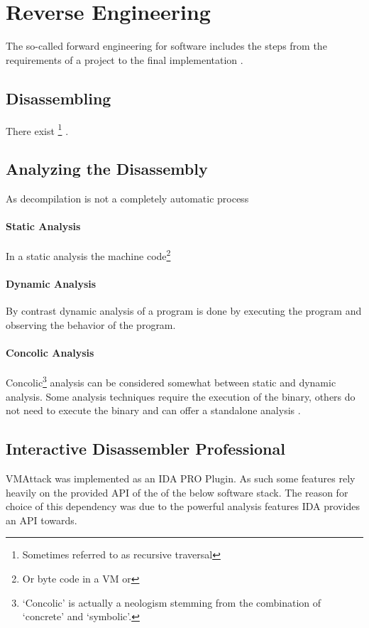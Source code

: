 \documentclass[10pt,twoside,a4paper,bibliography=totoc]{scrbook}
\begin{document}
\section{Reverse Engineering}
\label{sec2:re}
The so-called forward engineering for software includes the steps from the requirements of a project to the final implementation \cite{reeng}. 

\subsection{Disassembling}
\label{sec2:disassm}
There exist \footnote{Sometimes referred to as recursive traversal} \cite{idabook}.

\subsection{Analyzing the Disassembly}
\label{sec2:analysis}

As decompilation is not a completely automatic process

\paragraph*{Static Analysis}
In a static analysis the machine code\footnote{Or byte code in a VM or }

\paragraph*{Dynamic Analysis}
By contrast dynamic analysis of a program is done by executing the program and observing the behavior of the program.


\paragraph*{Concolic Analysis}
Concolic\footnote{`Concolic' is actually a neologism stemming from the combination of `concrete' and `symbolic'. } analysis can be considered somewhat between static and dynamic analysis. Some analysis techniques require the execution of the binary, others do not need to execute the binary and can offer a standalone analysis \cite{taint}.

\subsection{Interactive Disassembler Professional}
\label{sec2:ida}
VMAttack was implemented as an IDA PRO Plugin. As such some features rely heavily on the provided API of the of the below software stack. The reason for choice of this dependency was due to the powerful analysis features IDA provides an API towards. 
\end{document}

